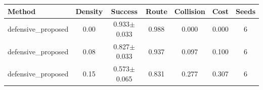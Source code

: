 \begin{tabular}{lcccccc}
\toprule
Method & Density & Success & Route & Collision & Cost & Seeds \\ 
\midrule
defensive_proposed & 0.00 & 0.933$\pm$0.033 & 0.988 & 0.000 & 0.000 & 6 \\ 
defensive_proposed & 0.08 & 0.827$\pm$0.033 & 0.937 & 0.097 & 0.100 & 6 \\ 
defensive_proposed & 0.15 & 0.573$\pm$0.065 & 0.831 & 0.277 & 0.307 & 6 \\ 
\bottomrule
\end{tabular}
